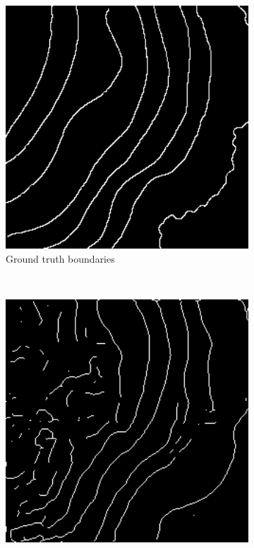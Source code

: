 \begin{figure}[!t]
    \centering
    \begin{subfigure}[t]{0.32\textwidth}
        \centering
        \includegraphics[width=1\textwidth, valign=c]{images/lr-comparison.png}
        \caption{Ground truth boundaries}
    \end{subfigure}
    ~
    \begin{subfigure}[t]{0.32\textwidth}
        \centering
        \includegraphics[width=1\textwidth, valign=c]{images/1e4-example.png}

\end{subfigure}
\end{figure}
